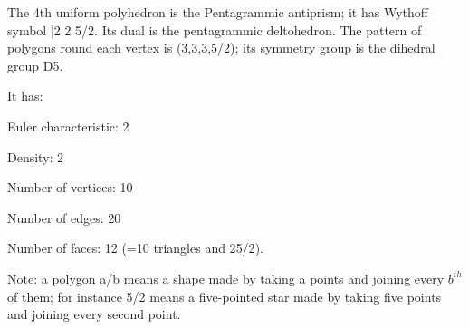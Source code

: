 The 4th uniform polyhedron is the Pentagrammic antiprism; it has Wythoff symbol |2 2 5/2. Its dual is the pentagrammic deltohedron. The pattern of polygons round each vertex is (3,3,3,5/2); its symmetry group is the dihedral group D5.\par
It has:\par
Euler characteristic: 2\par
Density: 2\par
Number of vertices: 10\par
Number of edges:  20\par
Number of faces: 12 (=10 triangles and 2{5/2}).\par
Note: a polygon a/b means a shape made by taking a points and joining every $b^{th}$  of them; for instance 5/2 means a five-pointed star made by taking five points and joining every second point.